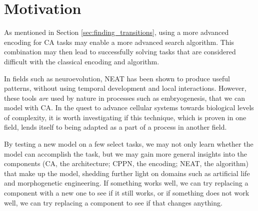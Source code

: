 \section{Motivation}
As mentioned in Section \ref{sec:finding_transitions},
using a more advanced encoding for CA tasks may enable a more advanced search algorithm.
This combination may then lead to successfully solving tasks that are considered difficult with the classical encoding and algorithm.

In fields such as neuroevolution,
NEAT has been shown to produce useful patterns,
without using temporal development and local interactions.
However, these tools \textit{are} used by nature in processes such as embryogenesis,
that we can model with CA.
In the quest to advance cellular systems towards biological levels of complexity,
it is worth investigating if this technique, which is proven in one field,
lends itself to being adapted as a part of a process in another field.

By testing a new model on a few select tasks, we may not only learn whether the model can accomplish the task,
but we may gain more general insights into the components (CA, the architecture; CPPN, the encoding; NEAT, the algorithm) that make up the model,
shedding further light on domains such as artificial life and morphogenetic engineering.
If something works well, we can try replacing a component with a new one to see if it still works,
or if something does not work well, we can try replacing a component to see if that changes anything.
